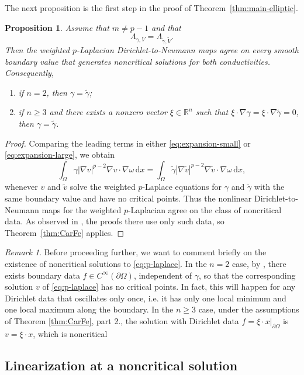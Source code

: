 \documentclass[a4paper,12pt]{article}
\newcommand{\pr}{\partial}
\newcommand{\dom}{\Omega}
\newcommand{\R}{\mathbb{R}}
\newcommand{\dd}{\,\mathrm{d}}
\newtheorem{prop}[thm]{Proposition}
\theoremstyle{definition}
\theoremstyle{remark}
\newtheorem{rem}[thm]{Remark}
\begin{document}
The next proposition is the first step in the proof of Theorem~\ref{thm:main-elliptic}.

\begin{prop}\label{prop:recover-gamma}
Assume that $m\neq p-1$ and that
\[
\Lambda_{\gamma,V}=\Lambda_{\tilde\gamma,\tilde V}.
\]
Then the weighted $p$-Laplacian Dirichlet-to-Neumann maps agree on every smooth boundary value that generates noncritical solutions for both conductivities. Consequently,
\begin{enumerate}
\item if $n=2$, then $\gamma=\tilde\gamma$;
\item if $n\ge 3$ and there exists a nonzero vector $\xi\in\R^n$ such that $\xi\cdot\nabla\gamma=\xi\cdot\nabla\tilde\gamma=0$, then $\gamma=\tilde\gamma$.
\end{enumerate}
\end{prop}

\begin{proof}
Comparing the leading terms in either \eqref{eq:expansion-small} or \eqref{eq:expansion-large}, we obtain
\[
\int_\Omega\gamma|\nabla v|^{p-2}\nabla v\cdot\nabla\omega\dd x
=
\int_\Omega\tilde\gamma|\nabla \tilde v|^{p-2}\nabla \tilde v\cdot\nabla\omega\dd x,
\]
whenever $v$ and $\tilde v$ solve the weighted $p$-Laplace equations for $\gamma$ and $\tilde\gamma$ with the same boundary value and have no critical points. Thus the nonlinear Dirichlet-to-Neumann maps for the weighted $p$-Laplacian agree on the class of noncritical data. As observed in \cite{CarFe3}, the proofs there use only such data, so Theorem~\ref{thm:CarFe} applies.
\end{proof}
\begin{rem}\label{rem:63}
Before proceeding further, we want to comment briefly on the existence of noncritical solutions to \eqref{eq:p-laplace}. In the $n=2$ case, by \cite[Theorem 5.1]{AlSi}, there exists boundary data $f\in C^\infty(\pr\dom)$, independent of $\gamma$, so that the corresponding solution $v$ of \eqref{eq:p-laplace} has no critical points. In fact, this will happen for any Dirichlet data that oscillates only once, i.e. it has only one local minimum and one local maximum along the boundary. In the $n\geq 3$ case, under the assumptions of Theorem \ref{thm:CarFe}, part 2., the solution with Dirichlet data $f=\xi\cdot x|_{\pr\dom}$ is  $v=\xi\cdot x$, which is noncritical
\end{rem}

\subsection{Linearization at a noncritical solution}
\end{document}
